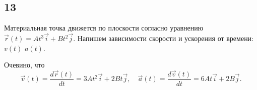 \subsection{13}

Материальная точка движется по плоскости согласно уравнению $\vec r(t)=At^3\vec i+Bt^2\vec j$. Напишем зависимости скорости и ускорения от времени: $v(t)$ $a(t)$.

Очевино, что
\[
\vec v(t)=\frac{d\vec r(t)}{dt}=3At^2\vec i+2Bt\vec j,\quad\vec a(t)=\frac{d\vec v(t)}{dt}=6At\vec i+2B\vec j.
\]